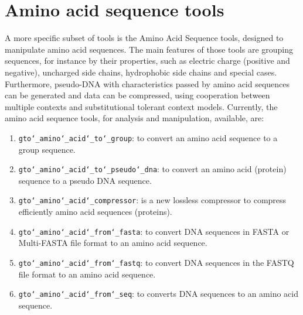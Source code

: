 \chapter{Amino acid sequence tools}
\label{seq}
A more specific subset of tools is the Amino Acid Sequence tools, designed to manipulate amino acid sequences. The main features of those tools are grouping sequences, for instance by their properties, such as electric charge (positive and negative), uncharged side chains, hydrophobic side chains and special cases. Furthermore, pseudo-DNA with characteristics passed by amino acid sequences can be generated and data can be compressed, using cooperation between multiple contexts and substitutional tolerant context models. Currently, the amino acid sequence tools, for analysis and manipulation, available, are:
\begin{enumerate}
	
\item \texttt{gto\char`_amino\char`_acid\char`_to\char`_group}: to convert an amino acid sequence to a group sequence.

\item \texttt{gto\char`_amino\char`_acid\char`_to\char`_pseudo\char`_dna}: to convert an amino acid (protein) sequence to a pseudo DNA sequence.

\item \texttt{gto\char`_amino\char`_acid\char`_compressor}: is a new lossless compressor to compress efficiently amino acid sequences (proteins).

\item \texttt{gto\char`_amino\char`_acid\char`_from\char`_fasta}: to convert DNA sequences in FASTA or Multi-FASTA file format to an amino acid sequence.

\item \texttt{gto\char`_amino\char`_acid\char`_from\char`_fastq}: to convert DNA sequences in the FASTQ file format to an amino acid sequence.

\item \texttt{gto\char`_amino\char`_acid\char`_from\char`_seq}: to converts DNA sequences to an amino acid sequence.


\end{enumerate}







%
